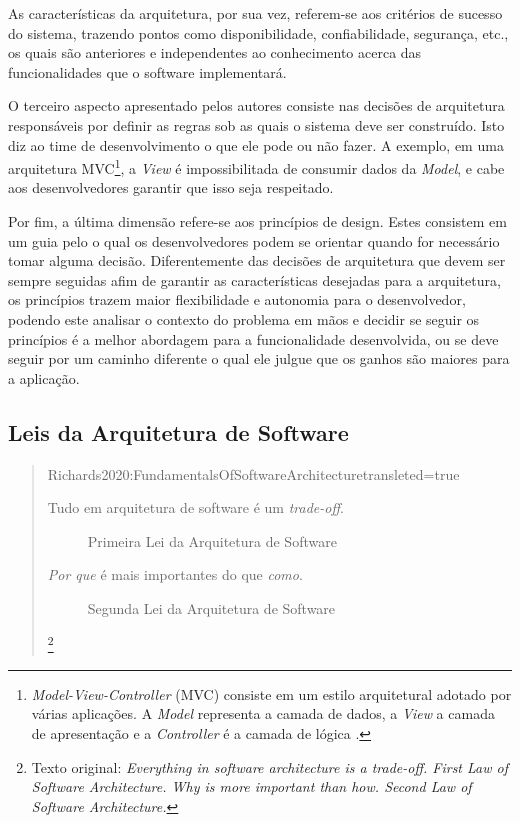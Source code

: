 As características da arquitetura, por sua vez, referem-se aos critérios de sucesso do sistema,
trazendo pontos como disponibilidade, confiabilidade, segurança, etc., os quais são anteriores e
independentes ao conhecimento acerca das funcionalidades que o software implementará.

O terceiro aspecto apresentado pelos autores consiste nas decisões de arquitetura responsáveis por definir
as regras sob as quais o sistema deve ser construído. Isto diz ao time de desenvolvimento o que ele
pode ou não fazer. A exemplo, em uma arquitetura \gls{MVC}\footnote{\textit{Model-View-Controller} (MVC)
consiste em um estilo arquitetural adotado por várias aplicações. A \textit{Model} representa a
camada de dados, a \textit{View} a camada de apresentação e a \textit{Controller} é a camada de
lógica \cite{mcgovern2004practical}.}, a \textit{View} é
impossibilitada de consumir dados da \textit{Model}, e cabe aos desenvolvedores garantir que isso
seja respeitado.

Por fim, a última dimensão refere-se aos princípios de design. Estes consistem em um guia pelo o qual
os desenvolvedores podem se orientar quando for necessário tomar alguma decisão. Diferentemente das
decisões de arquitetura que devem ser sempre seguidas afim de  garantir as características desejadas
para a arquitetura, os princípios trazem maior flexibilidade e autonomia para o desenvolvedor, podendo
este analisar o contexto do problema em mãos e decidir se seguir os princípios é a melhor abordagem
para a funcionalidade desenvolvida, ou se deve seguir por um caminho diferente o qual ele julgue que
os ganhos são maiores para a aplicação.

\subsection{Leis da Arquitetura de Software}

\begin{quotation}{Richards2020:FundamentalsOfSoftwareArchitecture}{transleted=true}
  \begin{description}
    \item [Tudo em arquitetura de software é um \textit{trade-off}.] Primeira Lei da Arquitetura de
        Software
    \item [\textit{Por que} é mais importantes do que \textit{como}.] Segunda Lei da Arquitetura de Software
  \end{description}\footnote{Texto original: \textit{Everything in software architecture is a trade-off. First Law
    of Software Architecture. Why is more important than how. Second Law of Software Architecture.}}
\end{quotation}

